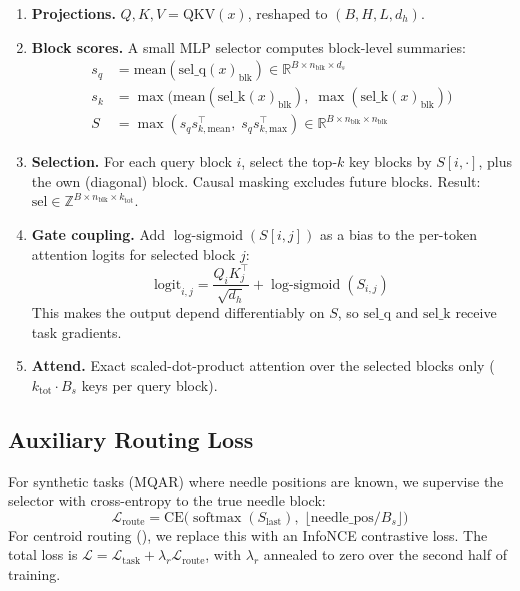 \documentclass[10pt,letterpaper]{article}
\newcommand{\R}{\mathbb{R}}
\newcommand{\softmax}{\operatorname{softmax}}
\newcommand{\LogSigmoid}{\operatorname{log\text{-}sigmoid}}
\begin{document}
\begin{enumerate}[leftmargin=*,itemsep=1pt]
\item \textbf{Projections.} $Q, K, V = \text{QKV}(x)$, reshaped to
  $(B, H, L, d_h)$.
\item \textbf{Block scores.} A small MLP selector computes block-level
  summaries:
  \begin{align}
    s_q &= \text{mean}(\text{sel\_q}(x)_{\text{blk}}) \in \R^{B \times n_{\text{blk}} \times d_s} \\
    s_k &= \max\bigl(\text{mean}(\text{sel\_k}(x)_{\text{blk}}),\;
               \max(\text{sel\_k}(x)_{\text{blk}})\bigr) \\
    S &= \max(s_q s_{k,\text{mean}}^\top,\; s_q s_{k,\text{max}}^\top)
      \in \R^{B \times n_{\text{blk}} \times n_{\text{blk}}}
  \end{align}
\item \textbf{Selection.} For each query block $i$, select the top-$k$ key
  blocks by $S[i, \cdot]$, plus the own (diagonal) block. Causal masking
  excludes future blocks. Result:
  $\text{sel} \in \mathbb{Z}^{B \times n_{\text{blk}} \times k_{\text{tot}}}$.
\item \textbf{Gate coupling.} Add $\LogSigmoid(S[i, j])$ as a bias to the
  per-token attention logits for selected block $j$:
  \begin{equation}
    \text{logit}_{i,j} = \frac{Q_i K_j^\top}{\sqrt{d_h}} + \LogSigmoid(S_{i,j})
  \end{equation}
  This makes the output depend differentiably on $S$, so $\text{sel\_q}$ and
  $\text{sel\_k}$ receive task gradients.
\item \textbf{Attend.} Exact scaled-dot-product attention over the selected
  blocks only ($k_{\text{tot}} \cdot B_s$ keys per query block).
\end{enumerate}

\subsection{Auxiliary Routing Loss}

For synthetic tasks (MQAR) where needle positions are known, we supervise the
selector with cross-entropy to the true needle block:
\begin{equation}
  \mathcal{L}_{\text{route}} = \text{CE}\bigl(\softmax(S_{\text{last}}),\;
  \lfloor \text{needle\_pos} / B_s \rfloor\bigr)
\end{equation}
For centroid routing (), we replace this with an InfoNCE
contrastive loss. The total loss is
$\mathcal{L} = \mathcal{L}_{\text{task}} + \lambda_r \mathcal{L}_{\text{route}}$,
with $\lambda_r$ annealed to zero over the second half of training.
\end{document}
